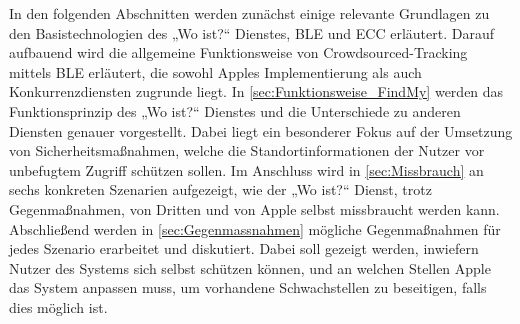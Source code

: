 In den folgenden Abschnitten werden zunächst einige relevante Grundlagen zu den Basistechnologien des „Wo ist?“ Dienstes, \ac{BLE} und \ac{ECC} erläutert.
Darauf aufbauend wird die allgemeine Funktionsweise von Crowdsourced-Tracking mittels \ac{BLE} erläutert, die sowohl Apples Implementierung als auch Konkurrenzdiensten zugrunde liegt.
In \autoref{sec:Funktionsweise_FindMy} werden das Funktionsprinzip des „Wo ist?“ Dienstes und die Unterschiede zu anderen Diensten genauer vorgestellt.
Dabei liegt ein besonderer Fokus auf der Umsetzung von Sicherheitsmaßnahmen, welche die Standortinformationen der Nutzer vor unbefugtem Zugriff schützen sollen.
Im Anschluss wird in \autoref{sec:Missbrauch} an sechs konkreten Szenarien aufgezeigt, wie der „Wo ist?“ Dienst, trotz Gegenmaßnahmen, von Dritten und von Apple selbst missbraucht werden kann.
Abschließend werden in \autoref{sec:Gegenmassnahmen} mögliche Gegenmaßnahmen für jedes Szenario erarbeitet und diskutiert.
Dabei soll gezeigt werden, inwiefern Nutzer des Systems sich selbst schützen können, und an welchen Stellen Apple das System anpassen muss, um vorhandene Schwachstellen zu beseitigen, falls dies möglich ist.